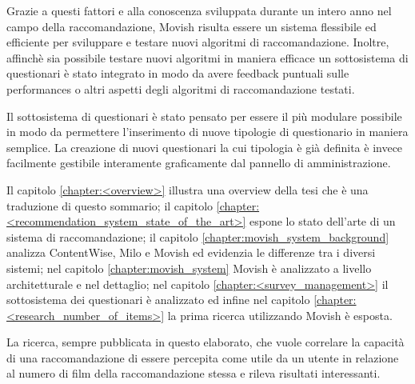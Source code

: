 Grazie a questi fattori e alla conoscenza sviluppata durante un intero anno nel campo della raccomandazione, Movish risulta essere un sistema flessibile ed efficiente per sviluppare e testare nuovi algoritmi di raccomandazione. Inoltre, affinch\`e sia possibile testare nuovi algoritmi in maniera efficace un sottosistema di questionari \`e stato integrato in modo da avere feedback puntuali sulle performances o altri aspetti degli algoritmi di raccomandazione testati.

Il sottosistema di questionari \`e stato pensato per essere il pi\`u modulare possibile in modo da permettere l'inserimento di nuove tipologie di questionario in maniera semplice. La creazione di nuovi questionari la cui tipologia \`e gi\`a definita \`e invece facilmente gestibile interamente graficamente dal pannello di amministrazione.

Il capitolo \ref{chapter:<overview>} illustra una overview della tesi che \`e una traduzione di questo sommario; il capitolo \ref{chapter:<recommendation_system_state_of_the_art>} espone lo stato dell'arte di un sistema di raccomandazione; il capitolo \ref{chapter:movish_system_background} analizza ContentWise, Milo e Movish ed evidenzia le differenze tra i diversi sistemi; nel capitolo \ref{chapter:movish_system} Movish \`e analizzato a livello architetturale e nel dettaglio; nel capitolo \ref{chapter:<survey_management>} il sottosistema dei questionari \`e analizzato ed infine nel capitolo \ref{chapter:<research_number_of_items>} la prima ricerca utilizzando Movish \`e esposta. 
 
La ricerca, sempre pubblicata in questo elaborato, che vuole correlare la capacit\`a di una raccomandazione di essere percepita come utile da un utente in relazione al numero di film della raccomandazione stessa e rileva risultati interessanti.

\acresetall
